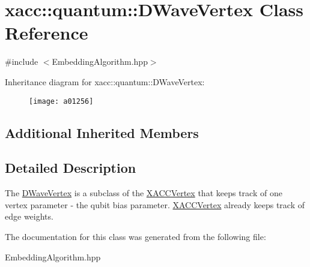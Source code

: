 \hypertarget{a01256}{}\section{xacc\+:\+:quantum\+:\+:D\+Wave\+Vertex Class Reference}
\label{a01256}


{\ttfamily \#include $<$Embedding\+Algorithm.\+hpp$>$}

Inheritance diagram for xacc\+:\+:quantum\+:\+:D\+Wave\+Vertex\+:\begin{figure}[H]
\begin{center}
\leavevmode
\texttt{[image: a01256]}
\end{center}
\end{figure}
\subsection*{Additional Inherited Members}


\subsection{Detailed Description}
The \hyperlink{a01256}{D\+Wave\+Vertex} is a subclass of the \hyperlink{a02516}{X\+A\+C\+C\+Vertex} that keeps track of one vertex parameter -\/ the qubit bias parameter. \hyperlink{a02516}{X\+A\+C\+C\+Vertex} already keeps track of edge weights. 

The documentation for this class was generated from the following file\+:\begin{DoxyCompactItemize}
\item 
Embedding\+Algorithm.\+hpp\end{DoxyCompactItemize}
